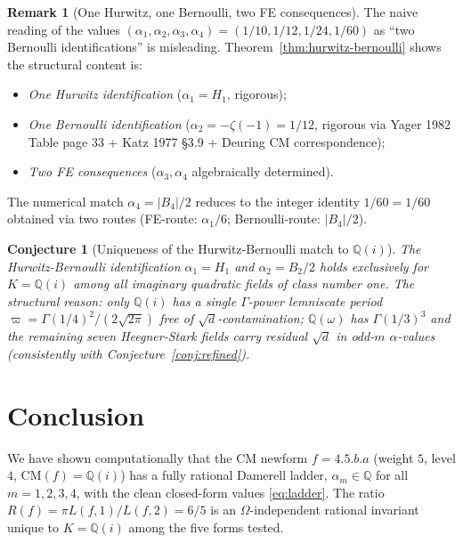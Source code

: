 \documentclass[10pt]{article}
\newtheorem{conjecture}[theorem]{Conjecture}
\theoremstyle{definition}
\newtheorem{remark}[theorem]{Remark}
\newcommand{\Q}{\mathbb{Q}}
\begin{document}
\begin{remark}[One Hurwitz, one Bernoulli, two FE consequences]
The naive reading of the values $(\alpha_1, \alpha_2, \alpha_3, \alpha_4)
= (1/10, 1/12, 1/24, 1/60)$ as ``two Bernoulli identifications'' is misleading.
Theorem~\ref{thm:hurwitz-bernoulli} shows the structural content is:
\begin{itemize}
  \item \emph{One Hurwitz identification} ($\alpha_1 = H_1$, rigorous);
  \item \emph{One Bernoulli identification} ($\alpha_2 = -\zeta(-1) = 1/12$,
        rigorous via Yager 1982 Table page 33 + Katz 1977 \S{}3.9 + Deuring
        CM correspondence);
  \item \emph{Two FE consequences} ($\alpha_3, \alpha_4$ algebraically determined).
\end{itemize}
The numerical match $\alpha_4 = |B_4|/2$ reduces to the integer identity
$1/60 = 1/60$ obtained via two routes (FE-route: $\alpha_1/6$;
Bernoulli-route: $|B_4|/2$).
\end{remark}

\begin{conjecture}[Uniqueness of the Hurwitz-Bernoulli match to $\Q(i)$]
\label{conj:M114B}
The Hurwitz-Bernoulli identification $\alpha_1 = H_1$ and $\alpha_2 = B_2/2$
holds exclusively for $K = \Q(i)$ among all imaginary quadratic fields of
class number one.  The structural reason: only $\Q(i)$ has a single
$\Gamma$-power lemniscate period $\varpi = \Gamma(1/4)^2/(2\sqrt{2\pi})$
free of $\sqrt{d}$-contamination; $\Q(\omega)$ has $\Gamma(1/3)^3$ and the
remaining seven Heegner-Stark fields carry residual $\sqrt{d}$ in odd-$m$
$\alpha$-values (consistently with Conjecture~\ref{conj:refined}).
\end{conjecture}

\section{Conclusion}

We have shown computationally that the CM newform $f = 4.5.b.a$ (weight $5$, level $4$,
$\mathrm{CM}(f) = \Q(i)$) has a fully rational Damerell ladder, $\alpha_m \in \Q$ for
all $m = 1,2,3,4$, with the clean closed-form values \eqref{eq:ladder}.  The ratio
$R(f) = \pi L(f,1)/L(f,2) = 6/5$ is an $\Omega$-independent rational invariant unique to
$K = \Q(i)$ among the five forms tested.
\end{document}

